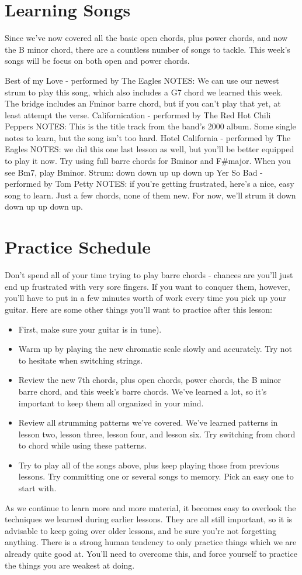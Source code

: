 \section{Learning Songs}
Since we've now covered all the basic open chords, plus power chords, and now the B minor chord, there are a countless number of songs to tackle. This week's songs will be focus on both open and power chords. 

Best of my Love - performed by The Eagles
NOTES: We can use our newest strum to play this song, which also includes a G7 chord we learned this week. The bridge includes an Fminor barre chord, but if you can't play that yet, at least attempt the verse.
Californication - performed by The Red Hot Chili Peppers
NOTES: This is the title track from the band's 2000 album. Some single notes to learn, but the song isn't too hard.
Hotel California - performed by The Eagles
NOTES: we did this one last lesson as well, but you'll be better equipped to play it now. Try using full barre chords for Bminor and F\#major. When you see Bm7, play Bminor. Strum: down down up up down up
Yer So Bad - performed by Tom Petty
NOTES: if you're getting frustrated, here's a nice, easy song to learn. Just a few chords, none of them new. For now, we'll strum it down down up up down up.

\section{Practice Schedule}
Don't spend all of your time trying to play barre chords - chances are you'll just end up frustrated with very sore fingers. If you want to conquer them, however, you'll have to put in a few minutes worth of work every time you pick up your guitar. Here are some other things you'll want to practice after this lesson:
\begin{itemize}
\item First, make sure your guitar is in tune).
\item Warm up by playing the new chromatic scale slowly and accurately. Try not to hesitate when switching strings.
\item Review the new 7th chords, plus open chords, power chords, the B minor barre chord, and this week's barre chords. We've learned a lot, so it's important to keep them all organized in your mind.
\item Review all strumming patterns we've covered. We've learned patterns in lesson two, lesson three, lesson four, and lesson six. Try switching from chord to chord while using these patterns.
\item Try to play all of the songs above, plus keep playing those from previous lessons. Try committing one or several songs to memory. Pick an easy one to start with. 
\end{itemize}
As we continue to learn more and more material, it becomes easy to overlook the techniques we learned during earlier lessons. They are all still important, so it is advisable to keep going over older lessons, and be sure you're not forgetting anything. There is a strong human tendency to only practice things which we are already quite good at. You'll need to overcome this, and force yourself to practice the things you are weakest at doing.

